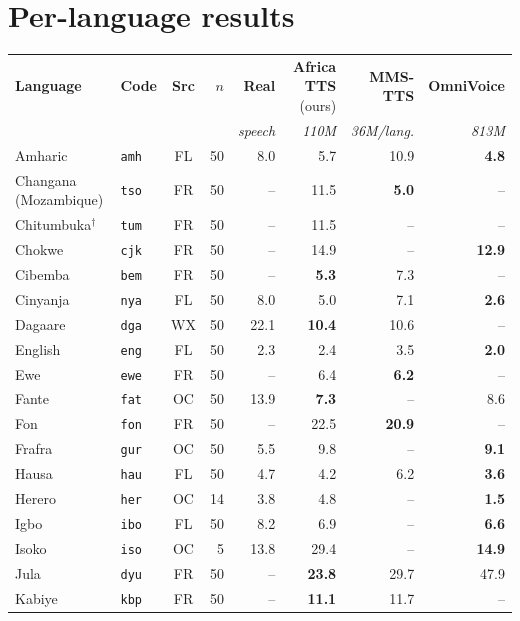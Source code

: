\documentclass[10pt,twocolumn]{article}
\begin{document}
\section{Per-language results}
\begin{table}[h!]
\centering
\small
\setlength{\tabcolsep}{4pt}
\begin{tabular}{llcrrrrr}
\toprule
\textbf{Language} & \textbf{Code} & \textbf{Src} & \textbf{$n$} & \textbf{Real} & \textbf{Africa TTS} (ours) & \textbf{MMS-TTS} & \textbf{OmniVoice} \\
 &  &  &  & \textit{speech} & \textit{110M} & \textit{36M/lang.} & \textit{813M} \\
\midrule
Amharic & \texttt{amh} & FL & 50 & 8.0 & 5.7 & 10.9 & \textbf{4.8} \\
Changana (Mozambique) & \texttt{tso} & FR & 50 & -- & 11.5 & \textbf{5.0} & -- \\
Chitumbuka$^\dagger$ & \texttt{tum} & FR & 50 & -- & 11.5 & -- & -- \\
Chokwe & \texttt{cjk} & FR & 50 & -- & 14.9 & -- & \textbf{12.9} \\
Cibemba & \texttt{bem} & FR & 50 & -- & \textbf{5.3} & 7.3 & -- \\
Cinyanja & \texttt{nya} & FL & 50 & 8.0 & 5.0 & 7.1 & \textbf{2.6} \\
Dagaare & \texttt{dga} & WX & 50 & 22.1 & \textbf{10.4} & 10.6 & -- \\
English & \texttt{eng} & FL & 50 & 2.3 & 2.4 & 3.5 & \textbf{2.0} \\
Ewe & \texttt{ewe} & FR & 50 & -- & 6.4 & \textbf{6.2} & -- \\
Fante & \texttt{fat} & OC & 50 & 13.9 & \textbf{7.3} & -- & 8.6 \\
Fon & \texttt{fon} & FR & 50 & -- & 22.5 & \textbf{20.9} & -- \\
Frafra & \texttt{gur} & OC & 50 & 5.5 & 9.8 & -- & \textbf{9.1} \\
Hausa & \texttt{hau} & FL & 50 & 4.7 & 4.2 & 6.2 & \textbf{3.6} \\
Herero & \texttt{her} & OC & 14 & 3.8 & 4.8 & -- & \textbf{1.5} \\
Igbo & \texttt{ibo} & FL & 50 & 8.2 & 6.9 & -- & \textbf{6.6} \\
Isoko & \texttt{iso} & OC & 5 & 13.8 & 29.4 & -- & \textbf{14.9} \\
Jula & \texttt{dyu} & FR & 50 & -- & \textbf{23.8} & 29.7 & 47.9 \\
Kabiye & \texttt{kbp} & FR & 50 & -- & \textbf{11.1} & 11.7 & -- \\

\end{tabular}
\end{table}
\end{document}
